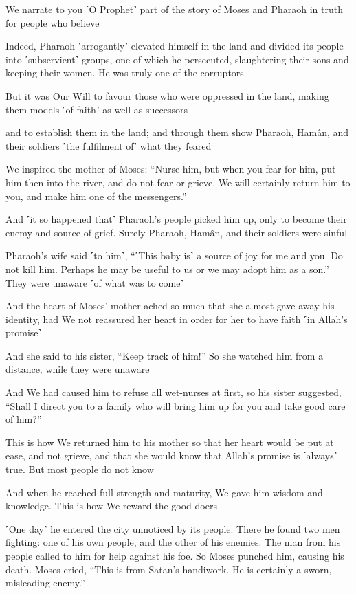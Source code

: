 We narrate to you ˹O Prophet˺ part of the story of Moses and Pharaoh in truth for people who believe

Indeed, Pharaoh ˹arrogantly˺ elevated himself in the land and divided its people into ˹subservient˺ groups, one of which he persecuted, slaughtering their sons and keeping their women. He was truly one of the corruptors

But it was Our Will to favour those who were oppressed in the land, making them models ˹of faith˺ as well as successors

and to establish them in the land; and through them show Pharaoh, Hamân, and their soldiers ˹the fulfilment of˺ what they feared

We inspired the mother of Moses: “Nurse him, but when you fear for him, put him then into the river, and do not fear or grieve. We will certainly return him to you, and make him one of the messengers.”

And ˹it so happened that˺ Pharaoh’s people picked him up, only to become their enemy and source of grief. Surely Pharaoh, Hamân, and their soldiers were sinful

Pharaoh’s wife said ˹to him˺, “˹This baby is˺ a source of joy for me and you. Do not kill him. Perhaps he may be useful to us or we may adopt him as a son.” They were unaware ˹of what was to come˺

And the heart of Moses’ mother ached so much that she almost gave away his identity, had We not reassured her heart in order for her to have faith ˹in Allah’s promise˺

And she said to his sister, “Keep track of him!” So she watched him from a distance, while they were unaware

And We had caused him to refuse all wet-nurses at first, so his sister suggested, “Shall I direct you to a family who will bring him up for you and take good care of him?”

This is how We returned him to his mother so that her heart would be put at ease, and not grieve, and that she would know that Allah’s promise is ˹always˺ true. But most people do not know

And when he reached full strength and maturity, We gave him wisdom and knowledge. This is how We reward the good-doers

˹One day˺ he entered the city unnoticed by its people. There he found two men fighting: one of his own people, and the other of his enemies. The man from his people called to him for help against his foe. So Moses punched him, causing his death. Moses cried, “This is from Satan’s handiwork. He is certainly a sworn, misleading enemy.”

